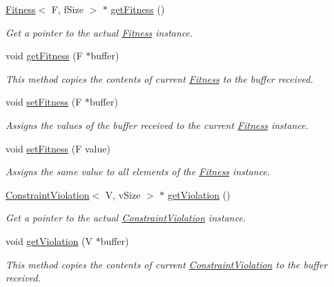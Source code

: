 \begin{DoxyCompactItemize}
\hyperlink{structFitness}{Fitness}$<$ F, f\+Size $>$ $\ast$ \hyperlink{classSolution_ae7720fedccf4ae8ff24170e159fd266f}{get\+Fitness} ()
\begin{DoxyCompactList}\small\item\em Get a pointer to the actual \hyperlink{structFitness}{Fitness} instance. \end{DoxyCompactList}\item 
void \hyperlink{classSolution_a559e603f729926a7be428906227b4dec}{get\+Fitness} (F $\ast$buffer)
\begin{DoxyCompactList}\small\item\em This method copies the contents of current \hyperlink{structFitness}{Fitness} to the buffer received. \end{DoxyCompactList}\item 
void \hyperlink{classSolution_a6c38d7e27c91077d67460a62aed71e06}{set\+Fitness} (F $\ast$buffer)
\begin{DoxyCompactList}\small\item\em Assigns the values of the buffer received to the current \hyperlink{structFitness}{Fitness} instance. \end{DoxyCompactList}\item 
void \hyperlink{classSolution_a06a103b71be515e1835c65abdf3dcb35}{set\+Fitness} (F value)
\begin{DoxyCompactList}\small\item\em Assigns the same value to all elements of the \hyperlink{structFitness}{Fitness} instance. \end{DoxyCompactList}\item 
\hyperlink{structConstraintViolation}{Constraint\+Violation}$<$ V, v\+Size $>$ $\ast$ \hyperlink{classSolution_a38a1110b2b585a6e7f2dc4210df0d536}{get\+Violation} ()
\begin{DoxyCompactList}\small\item\em Get a pointer to the actual \hyperlink{structConstraintViolation}{Constraint\+Violation} instance. \end{DoxyCompactList}\item 
void \hyperlink{classSolution_a6f8e92e6e412b9f2056c18c37c04da2d}{get\+Violation} (V $\ast$buffer)
\begin{DoxyCompactList}\small\item\em This method copies the contents of current \hyperlink{structConstraintViolation}{Constraint\+Violation} to the buffer received. \end{DoxyCompactList}\item 

\end{DoxyCompactItemize}
